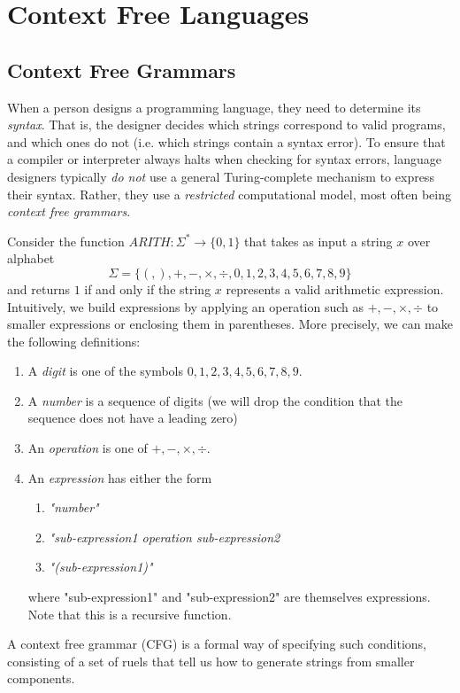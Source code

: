 \section{Context Free Languages}

\subsection{Context Free Grammars}

  When a person designs a programming language, they need to determine its \textit{syntax}. That is, the designer decides which strings correspond to valid programs, and which ones do not (i.e. which strings contain a syntax error). To ensure that a compiler or interpreter always halts when checking for syntax errors, language designers typically \textit{do not} use a general Turing-complete mechanism to express their syntax. Rather, they use a \textit{restricted} computational model, most often being \textit{context free grammars}. 

  Consider the function $ARITH: \Sigma^* \longrightarrow \{0,1\}$ that takes as input a string $x$ over alphabet 
  \[\Sigma = \{(, ), +, -, \times, \div, 0, 1, 2, 3, 4, 5, 6, 7, 8, 9\}\]
  and returns $1$ if and only if the string $x$ represents a valid arithmetic expression. Intuitively, we build expressions by applying an operation such as $+, -, \times, \div$ to smaller expressions or enclosing them in parentheses. More precisely, we can make the following definitions: 
  \begin{enumerate}
      \item A \textit{digit} is one of the symbols $0, 1, 2, 3, 4, 5, 6, 7, 8, 9$. 
      \item A \textit{number} is a sequence of digits (we will drop the condition that the sequence does not have a leading zero)
      \item An \textit{operation} is one of $+, -, \times, \div$. 
      \item An \textit{expression} has either the form 
      \begin{enumerate}
          \item \textit{"number"}
          \item \textit{"sub-expression1 operation sub-expression2}
          \item \textit{"(sub-expression1)"}
      \end{enumerate}
      where "sub-expression1" and "sub-expression2" are themselves expressions. Note that this is a recursive function. 
  \end{enumerate}
  A context free grammar (CFG) is a formal way of specifying such conditions, consisting of a set of ruels that tell us how to generate strings from smaller components. 

